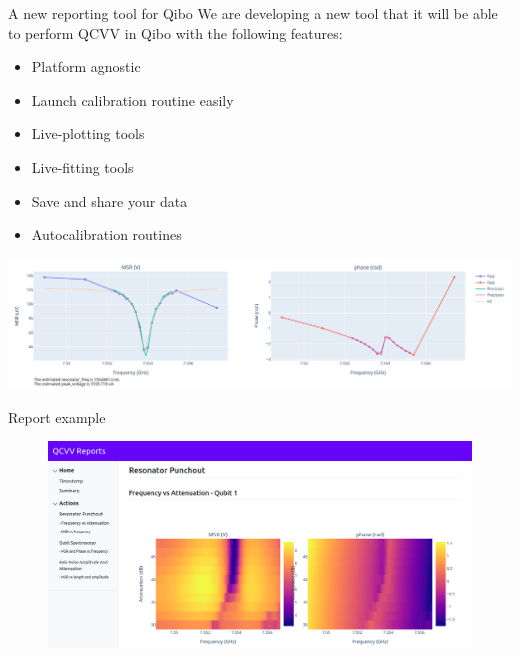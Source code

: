 \documentclass[11p,aspectratio=169]{beamer}
\begin{document}
\begin{frame}{A new reporting tool for Qibo}
    We are developing a new tool that it will be able to perform QCVV in Qibo
    with the following features:
            \begin{multicols*}{2}
                \begin{itemize}
                    \item[\faCaretSquareORight] Platform agnostic
                    \item[\faCaretSquareORight] Launch calibration routine easily
                    \item[\faCaretSquareORight] Live-plotting tools
                    \item[\faCaretSquareORight] Live-fitting tools
                    \item[\faCaretSquareORight]Save and share your data
                    \item[\faCaretSquareORight] Autocalibration routines
                \end{itemize}
            \end{multicols*}
            \includegraphics[width=\textwidth]{figures/resonator.png}
            

   
\end{frame}

\begin{frame}{Report example}
    
    \begin{figure}
        \includegraphics[width=\textwidth]{figures/qcvv.png}
    \end{figure}
    
\end{frame}
\end{document}
